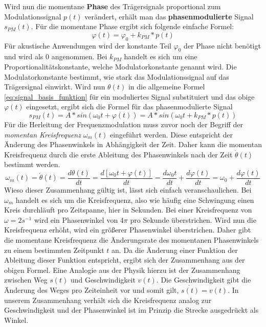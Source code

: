 Wird nun die momentane \textbf{Phase} des Trägersignals proportional zum Modulationssignal \(p(t)\) verändert, erhält man das \textbf{phasenmodulierte} Signal \(s_{PM}(t)\). \cite[S. 209]{lathi}
Für die momentane Phase ergibt sich folgende einfache Formel:
\begin{equation}
\varphi(t)=\varphi_0+k_{PM}*p(t)
\label{eq:varphi_t}
\end{equation}
Für akustische Anwendungen wird der konstante Teil \(\varphi_0\) der Phase nicht benötigt und wird als 0 angenommen. Bei \(k_{PM}\) handelt es sich um eine Proportionalitätskonstante, welche Modulatorkonstante genannt wird. Die Modulatorkonstante bestimmt, wie stark das Modulationssignal auf das Trägersignal einwirkt. Wird nun \(\theta(t)\) in die allgemeine Formel \ref{eq:signal_basis_funktion} für ein moduliertes Signal substituiert und das obige \(\varphi(t)\) eingesetzt, ergibt sich die Formel für das phasenmodulierte Signal
\begin{equation}
s_{PM}(t)=A*sin(\omega_0t + \varphi(t))=A*sin(\omega_0t+k_{PM}*p(t))
\label{eq:s_pm}
\end{equation}
Für die Herleitung der Frequenzmodulation muss zuvor noch der Begriff der \textit{momentan Kreisfrequenz} \(\omega_m(t)\) eingeführt werden.
Diese entspricht der Änderung des Phasenwinkels in Abhängigkeit der Zeit. Daher kann die momentan Kreisfrequenz durch die erste Ableitung des Phasenwinkels nach der Zeit $\dot \theta(t)$ bestimmt werden. \cite[S. 209]{lathi}
\begin{equation}
\omega_m(t)=\dot \theta(t)=\frac{d\theta(t)}{dt}=\frac{d[\omega_0t+\varphi(t)]}{dt}=\frac{d\omega_0t}{dt}+\frac{d\varphi(t)}{dt}=\omega_0+\frac{d\varphi(t)}{dt}
\label{eq:omega_m_herleitung}
\end{equation}
Wieso dieser Zusammenhang gültig ist, lässt sich einfach veranschaulichen. Bei \(\omega_m\) handelt es sich um die Kreisfrequenz, also wie häufig eine Schwingung einen Kreis durchläuft pro Zeitspanne, hier in Sekunden. Bei einer Kreisfrequenz von \(\omega=2 s^{-1}\) wird ein Phasenwinkel von \(4\pi\) pro Sekunde überstrichen. Wird nun die Kreisfrequenz erhöht, wird ein größerer Phasenwinkel überstrichen. Daher gibt die momentane Kreisfrequenz die Änderungsrate des momentanen Phasenwinkels zu einem bestimmten Zeitpunkt \(t\) an. Da die Änderung einer Funktion der Ableitung dieser Funktion entspricht, ergibt sich der Zusammenhang aus der obigen Formel. Eine Analogie aus der Physik hierzu ist der Zusammenhang zwischen Weg \(s(t)\) und Geschwindigkeit \(v(t)\). Die Geschwindigkeit gibt die Änderung des Weges pro Zeiteinheit vor und somit gilt, \(\dot{s(t)}=v(t)\). In unserem Zusammenhang verhält sich die Kreisfrequenz analog zur Geschwindigkeit und der Phasenwinkel ist im Prinzip die Strecke ausgedrückt als Winkel.

